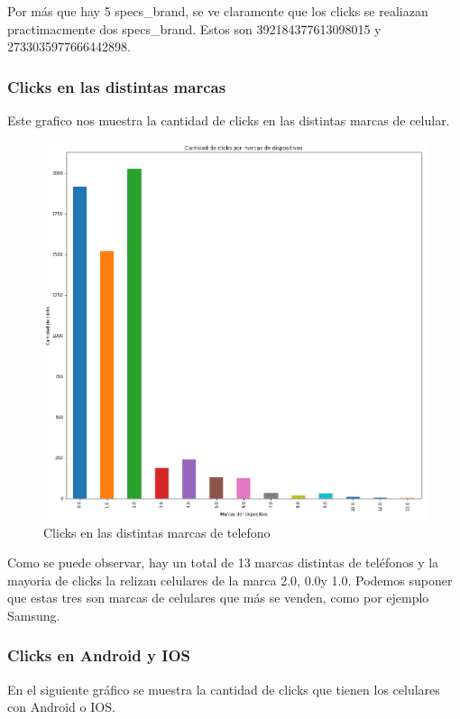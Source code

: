 \documentclass[a4paper, 12pt]{article}
\newcommand\tab[1][1cm]{\hspace*{#1}}
\begin{document}
		\tab Por más que hay 5 specs_brand, se ve claramente que los clicks se realiazan practimacmente dos specs_brand. Estos son 392184377613098015 y 2733035977666442898.
		

	\subsubsection{Clicks en las distintas marcas}
		\tab Este grafico nos muestra la cantidad de clicks en las distintas marcas de celular.

		\FloatBarrier
		\begin{figure}[h]
			\centering
			\includegraphics[width=\textwidth]{images/clicks/clicks_brand.png}
			\caption{Clicks en las distintas marcas de telefono}
		\end{figure}
		\FloatBarrier

		\tab Como se puede observar, hay un total de 13 marcas distintas de teléfonos y la mayoria de clicks la relizan celulares de la marca 2.0, 0.0y 1.0. Podemos suponer que estas tres son marcas de celulares que más se venden, como por ejemplo Samsung.

	\subsubsection{Clicks en Android y IOS}
		\tab En el siguiente gráfico se muestra la cantidad de clicks que tienen los celulares con Android o IOS.
\end{document}
